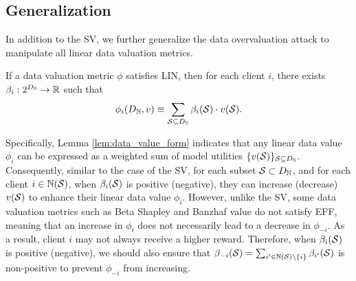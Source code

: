 

\subsection{Generalization}
In addition to the SV, we further generalize the data overvaluation attack to manipulate all linear data valuation metrics. 

\begin{lemma}
\label{lem:data_value_form}
    If a data valuation metric $\phi$ satisfies LIN, then for each client $i$, there exists $\beta_i: 2^{D_{\mathbb{N}}} \rightarrow \mathbb{R}$ such that
    \begin{align*}
        \phi_{i}(D_{\mathbb{N}}, v) \equiv \sum_{\mathcal{S} \subseteq D_{\mathbb{N}}} \beta_i(\mathcal{S}) \cdot v(\mathcal{S}).
    \end{align*}
\end{lemma}

Specifically, Lemma \ref{lem:data_value_form} indicates that any linear data value $\phi_i$ can be expressed as a weighted sum of model utilities $\{v(\mathcal{S})\}_{\mathcal{S}\subseteq D_{\mathbb{N}}}$. 
Consequently, similar to the case of the SV, for each subset $\mathcal{S} \subset D_{\mathbb{N}}$, and for each client $i\in\mathbb{N}(\mathcal{S})$, when $\beta_i(\mathcal{S})$ is positive (negative), they can increase (decrease) $v(\mathcal{S})$ to enhance their linear data value $\phi_i$.
However, unlike the SV, some data valuation metrics such as Beta Shapley and Banzhaf value do not satisfy EFF, meaning that an increase in $\phi_{i}$ does not necessarily lead to a decrease in $\phi_{-i}$.
As a result, client $i$ may not always receive a higher reward.
Therefore, when $\beta_{i}(\mathcal{S})$ is positive (negative), we should also ensure that $\beta_{-i}(\mathcal{S})=\sum_{i' \in \mathbb{N}(\mathcal{S}) \setminus \{i\}} \beta_{i'}(\mathcal{S})$ is non-positive to prevent $\phi_{-i}$ from increasing.

